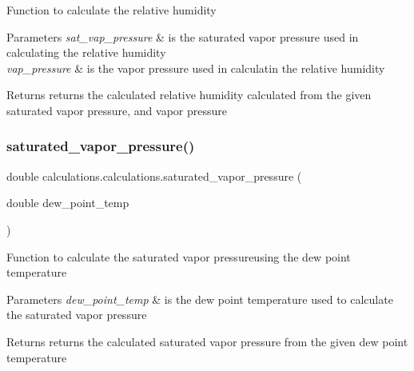 Function to calculate the relative humidity 
\begin{DoxyParams}{Parameters}
{\em sat\+\_\+vap\+\_\+pressure} & is the saturated vapor pressure used in calculating the relative humidity \\
\hline
{\em vap\+\_\+pressure} & is the vapor pressure used in calculatin the relative humidity \\
\hline
\end{DoxyParams}
\begin{DoxyReturn}{Returns}
returns the calculated relative humidity calculated from the given saturated vapor pressure, and vapor pressure 
\end{DoxyReturn}
\mbox{\label{classcalculations_1_1calculations_a2b7da37ed1c95d9894ac9dff614db9e7}} 
\subsubsection{\texorpdfstring{saturated\+\_\+vapor\+\_\+pressure()}{saturated\_vapor\_pressure()}}
{\footnotesize\ttfamily double calculations.\+calculations.\+saturated\+\_\+vapor\+\_\+pressure (\begin{DoxyParamCaption}\item[{double}]{dew\+\_\+point\+\_\+temp }\end{DoxyParamCaption})\hspace{0.3cm}{\ttfamily [inline]}}

Function to calculate the saturated vapor pressureusing the dew point temperature 
\begin{DoxyParams}{Parameters}
{\em dew\+\_\+point\+\_\+temp} & is the dew point temperature used to calculate the saturated vapor pressure \\
\hline
\end{DoxyParams}
\begin{DoxyReturn}{Returns}
returns the calculated saturated vapor pressure from the given dew point temperature 
\end{DoxyReturn}
\mbox{\label{classcalculations_1_1calculations_af2e526ba0ac77a303d9b458c2642e5f4}} 
